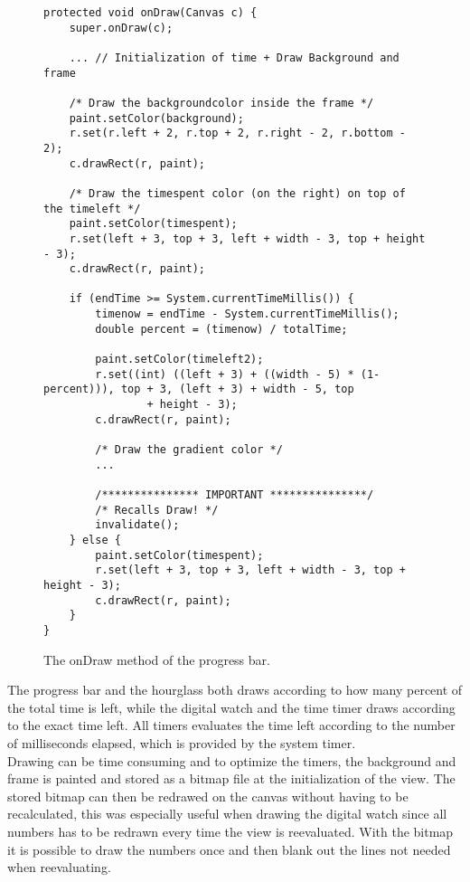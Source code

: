 \begin{figure}[H]%
\begin{lstlisting}
protected void onDraw(Canvas c) {
	super.onDraw(c);
	
	... // Initialization of time + Draw Background and frame

	/* Draw the backgroundcolor inside the frame */
	paint.setColor(background);
	r.set(r.left + 2, r.top + 2, r.right - 2, r.bottom - 2);
	c.drawRect(r, paint);

	/* Draw the timespent color (on the right) on top of the timeleft */
	paint.setColor(timespent);
	r.set(left + 3, top + 3, left + width - 3, top + height - 3);
	c.drawRect(r, paint);

	if (endTime >= System.currentTimeMillis()) {
		timenow = endTime - System.currentTimeMillis();
		double percent = (timenow) / totalTime;

		paint.setColor(timeleft2);
		r.set((int) ((left + 3) + ((width - 5) * (1-percent))), top + 3, (left + 3) + width - 5, top
				+ height - 3);
		c.drawRect(r, paint);

		/* Draw the gradient color */
		...

		/*************** IMPORTANT ***************/
		/* Recalls Draw! */
		invalidate();
	} else {
		paint.setColor(timespent);
		r.set(left + 3, top + 3, left + width - 3, top + height - 3);
		c.drawRect(r, paint);
	}
}
\end{lstlisting}
\caption{The onDraw method of the progress bar.}%
\label{code:backend_drawlib_onDraw}%
\end{figure}

The progress bar and the hourglass both draws according to how many percent of the total time is left, while the digital watch and the time timer draws according to the exact time left.
All timers evaluates the time left according to the number of milliseconds elapsed, which is provided by the system timer.\\


Drawing can be time consuming and to optimize the timers, the background and frame is painted and stored as a bitmap file at the initialization of the view.
The stored bitmap can then be redrawed on the canvas without having to be recalculated, this was especially useful when drawing the digital watch since all numbers has to be redrawn every time the view is reevaluated.
With the bitmap it is possible to draw the numbers once and then blank out the lines not needed when reevaluating.